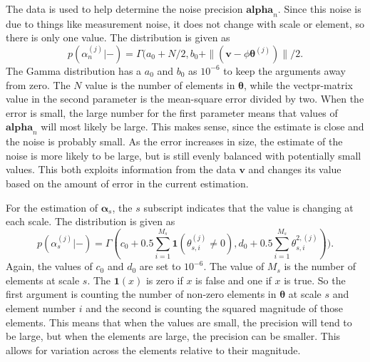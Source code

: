 \documentclass{IEEEtran}
\begin{document}
The data is used to help determine the noise precision
$\mathbf{alpha}_n$.  Since this noise is due to things like
measurement noise, it does not change with scale or element, so there
is only one value.  The distribution is given as 
\begin{equation}
 p(\alpha_n^{(j)}|-) =
    \Gamma(a_0+N/2,b_0+\|(\mathbf{v}-\phi\mathbf{\theta}^{(j)})\|/2 .
\label{alphan}
\end{equation}
The Gamma distribution has a $a_0$ and $b_0$ as $10^{-6}$ to keep the
arguments away from zero.  The $N$ value is the number of elements in
$\mathbf{\theta}$, while the vectpr-matrix value in the second
parameter is the mean-square error divided by two.  When the error is
small, the large number for the first parameter means that values of
$\mathbf{alpha}_n$ will most likely be large.  This makes sense, since
the estimate is close and the noise is probably small.  As the error
increases in size, the estimate of the noise is more likely to be
large, but is still evenly balanced with potentially small values.
This both exploits information from the data $\mathbf{v}$ and changes
its value based on the amount of error in the current estimation.

For the estimation of $\mathbf{\alpha}_s$, the $s$ subscript indicates
that the value is changing at each scale.  The distribution is given
as 
\begin{equation}
    p(\alpha_s^{(j)}|-) =  \Gamma(c_0+0.5\sum_{i=1}^{M_s}\mathbf{1}(\theta_{s,i}^{(j)}\neq
    0), d_0+0.5\sum_{i=1}^{M_s}\theta_{s,i}^{2,(j)})).
\label{alphas}
\end{equation}
Again, the values of $c_0$ and $d_0$ are set to $10^{-6}$.  The value
of $M_s$ is the number of elements at scale $s$.  The
$\mathbf{1}(x)$ is zero if $x$ is false and one if $x$ is true.  So
the first argument is counting the number of non-zero elements in
$\mathbf{\theta}$ at scale $s$ and element number $i$ and the
second is counting the squared magnitude of those elements.  This
means that when the values are small, the precision will tend to be
large, but when the elements are large, the precision can be smaller.
This allows for variation across the elements relative to their
magnitude.
\end{document}
